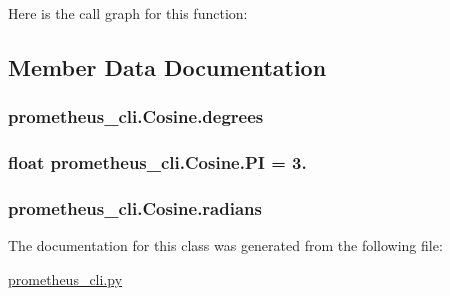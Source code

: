 Here is the call graph for this function\+:




\subsection{Member Data Documentation}
\hypertarget{classprometheus__cli_1_1_cosine_a31d6544340dd96d7e48a4493dba1bc00}{}
\subsubsection[{degrees}]{\setlength{\rightskip}{0pt plus 5cm}prometheus\+\_\+cli.\+Cosine.\+degrees}\label{classprometheus__cli_1_1_cosine_a31d6544340dd96d7e48a4493dba1bc00}
\hypertarget{classprometheus__cli_1_1_cosine_a7a990d68b5e124f572c17681347855fe}{}
\subsubsection[{P\+I}]{\setlength{\rightskip}{0pt plus 5cm}float prometheus\+\_\+cli.\+Cosine.\+P\+I = 3.\hspace{0.3cm}{\ttfamily [static]}}\label{classprometheus__cli_1_1_cosine_a7a990d68b5e124f572c17681347855fe}
\hypertarget{classprometheus__cli_1_1_cosine_a26ea80dbac47c25e1f22e33f70b78cca}{}
\subsubsection[{radians}]{\setlength{\rightskip}{0pt plus 5cm}prometheus\+\_\+cli.\+Cosine.\+radians}\label{classprometheus__cli_1_1_cosine_a26ea80dbac47c25e1f22e33f70b78cca}


The documentation for this class was generated from the following file\+:\begin{DoxyCompactItemize}
\item 
\hyperlink{prometheus__cli_8py}{prometheus\+\_\+cli.\+py}\end{DoxyCompactItemize}
